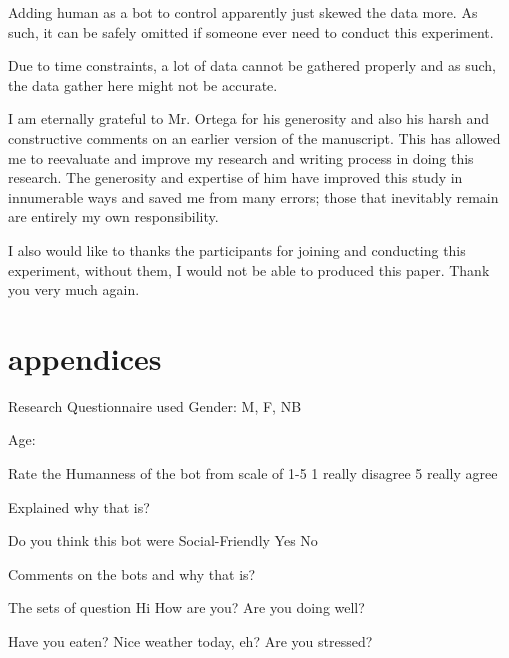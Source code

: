 \documentclass{vgtc}                          %
\begin{document}
Adding human as a bot to control apparently just skewed the data more. As such, it can be safely omitted if someone ever need to conduct this experiment.

Due to time constraints, a lot of data cannot be gathered properly and as such, the data gather here might not be accurate.

\acknowledgments{}
I am eternally grateful to Mr. Ortega for his generosity and also his harsh and constructive comments on an earlier version of the manuscript. This has allowed me to reevaluate and improve my research and writing process in doing this research. The generosity and expertise of him have improved this study in innumerable ways and saved me from many errors; those that inevitably remain are entirely my own responsibility.

I also would like to thanks the participants for joining and conducting this experiment, without them, I would not be able to produced this paper. Thank you very much again.






\section{appendices}
Research Questionnaire used
Gender: M, F, NB



Age:


Rate the Humanness of the bot from scale of 1-5
1 really disagree
5 really agree


Explained why that is?


Do you think this bot were Social-Friendly 
Yes
No

Comments on the bots and why that is?



The sets of question
Hi How are you?
Are you doing well?

Have you eaten?
Nice weather today, eh?
Are you stressed?
\end{document}
